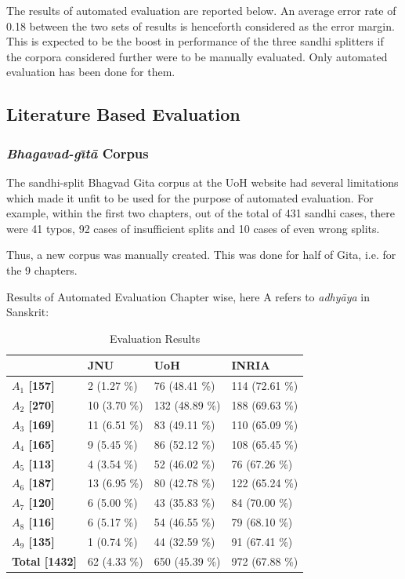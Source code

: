 \documentclass[11pt]{article}
\begin{document}
The results of automated evaluation are reported below. An average error rate of 0.18 between the two sets of results is henceforth  considered as the error margin. This is expected to be the boost in performance of the three sandhi splitters if the corpora considered further were to be manually evaluated. Only automated evaluation has been done for them.


\subsection{Literature Based Evaluation}

\subsubsection{\textit{Bhagavad-g\={\i}t\={a}} Corpus}

The sandhi-split Bhagvad Gita corpus at the UoH website had several limitations which made it unfit to be used for the purpose of automated evaluation. For example, within the first two chapters, out of the total of 431 sandhi cases, there were 41 typos, 92 cases of insufficient splits and 10 cases of even wrong splits.

Thus, a new corpus was manually created. This was done for half of Gita, i.e. for the 9 chapters.


Results of Automated Evaluation Chapter wise, here A refers to \textit{adhy\={a}ya} in Sanskrit:

\begin{table}[h]
\begin{center}
\begin{tabular}{p{1.4cm} | p{1.6cm} | p{1.5cm} | p{1.5cm}}
\hline 
 & \bf JNU & \bf UoH & \bf INRIA \\ 
 \hline
 
\bf $A_1$ [157] &   2 (1.27 \%) &   76 (48.41 \%) &   114 (72.61 \%) \\
\bf $A_2$ [270] &   10 (3.70 \%) &   132 (48.89 \%) &   188 (69.63 \%) \\
\bf $A_3$ [169] &   11 (6.51 \%) &   83 (49.11 \%) &   110 (65.09 \%) \\
\bf $A_4$ [165] &   9 (5.45 \%) &   86 (52.12 \%) &   108 (65.45 \%) \\
\bf $A_5$ [113] &   4 (3.54 \%) &   52 (46.02 \%) &   76 (67.26 \%) \\
\bf $A_6$ [187] &   13 (6.95 \%) &   80 (42.78 \%) &   122 (65.24 \%) \\
\bf $A_7$ [120] &   6 (5.00 \%) &   43 (35.83 \%) &   84 (70.00 \%) \\
\bf $A_8$ [116] &   6 (5.17 \%) &   54 (46.55 \%) &   79 (68.10 \%) \\
\bf $A_9$ [135] &   1 (0.74 \%) &   44 (32.59 \%) &   91 (67.41 \%) \\
\bf Total [1432] &   62 (4.33 \%) &   650 (45.39 \%) &   972 (67.88 \%) \\
 
\hline
\end{tabular}
\end{center}
\caption{\label{font-table} Evaluation Results }
\end{table}
\end{document}
